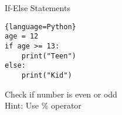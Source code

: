 \begin{frame}[fragile]{If-Else Statements}
    \begin{lstlisting}{language=Python}
age = 12
if age >= 13:
    print("Teen")
else:
    print("Kid")
    \end{lstlisting}
  
    \pause
    Check if number is even or odd \\
    Hint: Use \% operator
  \end{frame}